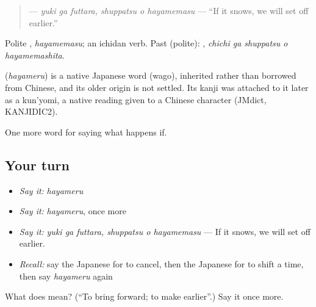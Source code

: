 \begin{quote}
\textbf{  } — \emph{yuki ga futtara, shuppatsu o hayamemasu} — \textquotedblleft{}If it snows, we will set off earlier.\textquotedblright{}
\end{quote}

Polite \textbf{}, \emph{hayamemasu}; an ichidan verb. Past (polite): \textbf{  }, \emph{chichi ga shuppatsu o hayamemashita}.

\begin{cousinweb}
\textbf{} (\emph{hayameru}) is a native Japanese word (wago), inherited rather than borrowed from Chinese, and its older origin is not settled. Its kanji was attached to it later as a kun'yomi, a native reading given to a Chinese character (JMdict, KANJIDIC2).
\end{cousinweb}

\begin{grammarlens}[title={What you've built}]
One more word for saying what happens if.
\end{grammarlens}

\subsection*{Your turn}
\begin{itemize}
\raggedright
  \item \emph{Say it:} \emph{hayameru}
  \item \emph{Say it:} \emph{hayameru}, once more
  \item \emph{Say it:} \emph{yuki ga futtara, shuppatsu o hayamemasu} — If it snows, we will set off earlier.
  \item \emph{Recall:} say the Japanese for to cancel, then the Japanese for to shift a time, then say \emph{hayameru} again
\end{itemize}

\begin{tcolorbox}[breakable,colback=teal!4,colframe=teal!35!black,title={Before you move on}]
What does  mean? (\textquotedblleft{}To bring forward; to make earlier\textquotedblright{}.) Say it once more.
\end{tcolorbox}

